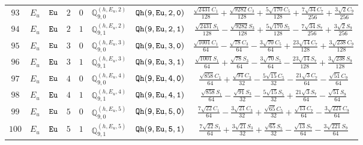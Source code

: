 \documentclass[fleqn,8pt]{jsarticle}
\begin{document}
\begin{table}[ht!]
\begin{center}
\begin{tabular}{cccccccc}
$ 93 $ & $ E_{u} $ & $ {\tt Eu} $ & $ 2 $ & $ 0 $ & $ \mathbb{Q}_{9,0}^{(h,E_{u},2)} $ & $ {\tt Qh(9,Eu,2,0)} $ & $ \frac{\sqrt{2431} C_{1}}{128} + \frac{\sqrt{9282} C_{3}}{128} + \frac{5 \sqrt{170} C_{5}}{128} + \frac{7 \sqrt{34} C_{7}}{256} + \frac{3 \sqrt{2} C_{9}}{256} $ \\
$ 94 $ & $ E_{u} $ & $ {\tt Eu} $ & $ 2 $ & $ 1 $ & $ \mathbb{Q}_{9,1}^{(h,E_{u},2)} $ & $ {\tt Qh(9,Eu,2,1)} $ & $ \frac{\sqrt{2431} S_{1}}{128} - \frac{\sqrt{9282} S_{3}}{128} + \frac{5 \sqrt{170} S_{5}}{128} - \frac{7 \sqrt{34} S_{7}}{256} + \frac{3 \sqrt{2} S_{9}}{256} $ \\
$ 95 $ & $ E_{u} $ & $ {\tt Eu} $ & $ 3 $ & $ 0 $ & $ \mathbb{Q}_{9,0}^{(h,E_{u},3)} $ & $ {\tt Qh(9,Eu,3,0)} $ & $ \frac{\sqrt{1001} C_{1}}{64} - \frac{\sqrt{78} C_{3}}{64} - \frac{3 \sqrt{70} C_{5}}{64} + \frac{23 \sqrt{14} C_{7}}{128} + \frac{3 \sqrt{238} C_{9}}{128} $ \\
$ 96 $ & $ E_{u} $ & $ {\tt Eu} $ & $ 3 $ & $ 1 $ & $ \mathbb{Q}_{9,1}^{(h,E_{u},3)} $ & $ {\tt Qh(9,Eu,3,1)} $ & $ \frac{\sqrt{1001} S_{1}}{64} + \frac{\sqrt{78} S_{3}}{64} - \frac{3 \sqrt{70} S_{5}}{64} - \frac{23 \sqrt{14} S_{7}}{128} + \frac{3 \sqrt{238} S_{9}}{128} $ \\
$ 97 $ & $ E_{u} $ & $ {\tt Eu} $ & $ 4 $ & $ 0 $ & $ \mathbb{Q}_{9,0}^{(h,E_{u},4)} $ & $ {\tt Qh(9,Eu,4,0)} $ & $ \frac{\sqrt{858} C_{1}}{64} + \frac{\sqrt{91} C_{3}}{32} - \frac{5 \sqrt{15} C_{5}}{32} - \frac{21 \sqrt{3} C_{7}}{64} - \frac{\sqrt{51} C_{9}}{64} $ \\
$ 98 $ & $ E_{u} $ & $ {\tt Eu} $ & $ 4 $ & $ 1 $ & $ \mathbb{Q}_{9,1}^{(h,E_{u},4)} $ & $ {\tt Qh(9,Eu,4,1)} $ & $ \frac{\sqrt{858} S_{1}}{64} - \frac{\sqrt{91} S_{3}}{32} - \frac{5 \sqrt{15} S_{5}}{32} + \frac{21 \sqrt{3} S_{7}}{64} - \frac{\sqrt{51} S_{9}}{64} $ \\
$ 99 $ & $ E_{u} $ & $ {\tt Eu} $ & $ 5 $ & $ 0 $ & $ \mathbb{Q}_{9,0}^{(h,E_{u},5)} $ & $ {\tt Qh(9,Eu,5,0)} $ & $ \frac{7 \sqrt{22} C_{1}}{64} - \frac{3 \sqrt{21} C_{3}}{32} + \frac{\sqrt{65} C_{5}}{32} + \frac{\sqrt{13} C_{7}}{64} - \frac{3 \sqrt{221} C_{9}}{64} $ \\
$ 100 $ & $ E_{u} $ & $ {\tt Eu} $ & $ 5 $ & $ 1 $ & $ \mathbb{Q}_{9,1}^{(h,E_{u},5)} $ & $ {\tt Qh(9,Eu,5,1)} $ & $ \frac{7 \sqrt{22} S_{1}}{64} + \frac{3 \sqrt{21} S_{3}}{32} + \frac{\sqrt{65} S_{5}}{32} - \frac{\sqrt{13} S_{7}}{64} - \frac{3 \sqrt{221} S_{9}}{64} $ \\
 \hline \hline
\end{tabular}
\end{center}
\end{table}
\end{document}
